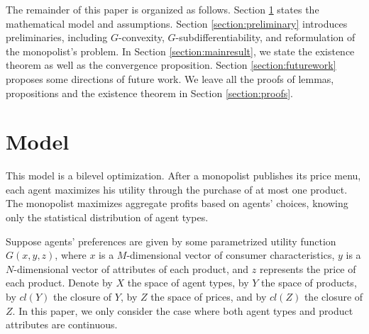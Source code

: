 \documentclass[a4paper, 11pt]{amsart}
\numberwithin{equation}{section}
\theoremstyle{plain}
\theoremstyle{definition}
\theoremstyle{remark}
\begin{document}
 



The remainder of this paper is organized as follows. Section \ref{section:model} states the mathematical model and assumptions. Section \ref{section:preliminary} introduces preliminaries, including $G$-convexity, $G$-subdifferentiability, and reformulation of the monopolist's problem. In Section \ref{section:mainresult}, we state the existence theorem as well as the convergence proposition. Section \ref{section:futurework} proposes some directions of future work. We leave all the proofs of lemmas, propositions and the existence theorem in Section \ref{section:proofs}. 
 

\bigskip
 

\section{Model}\label{section:model}



{This model is a bilevel optimization. After a monopolist publishes its price menu, each agent maximizes his utility through the purchase of at most one product. The monopolist maximizes aggregate profits based on agents' choices, knowing only the statistical distribution of agent types.}


Suppose agents' preferences are given by some parametrized utility function  $G(x, y, z)$, where $x$ is a $M$-dimensional vector of consumer characteristics, $y$ is a $N$-dimensional vector of attributes of each product, and $z$ represents the price of each product. Denote {by} $X$ the space of agent types, by $Y$ the space of products, by $cl(Y)$ the closure of $Y$, by $Z$ the space of prices, and by $cl(Z)$ the closure of $Z$. {In this paper, we only consider the case where both agent types and product attributes are continuous.} \medskip
\end{document}
